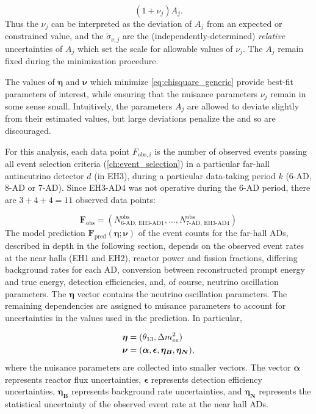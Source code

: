 \begin{equation}
    (1+\nu_j)A_j.
\end{equation}
Thus the $\nu_j$ can be interpreted as the deviation of $A_j$
from an expected or constrained value,
and the $\tilde{\sigma}_{\nu,j}$ are the (independently-determined)
\emph{relative} uncertainties of $A_j$
which set the scale for allowable values of $\nu_j$.
The $A_j$ remain fixed during the minimization procedure.

The values of $\boldsymbol{\eta}$ and $\boldsymbol{\nu}$
which minimize \cref{eq:chisquare_generic}
provide best-fit parameters of interest,
while ensuring that the nuisance parameters $\nu_j$
remain in some sense small.
Intuitively, the parameters $A_j$ are allowed to deviate slightly
from their estimated values,
but large deviations penalize the \chisquare{} and so are discouraged.

For this analysis, each data point $F_{\text{obs},i}$
is the number of observed events passing all event selection criteria
(\cref{ch:event_selection})
in a particular far-hall antineutrino detector $d$ (in EH3),
during a particular data-taking period $k$ (6-AD, 8-AD or 7-AD).
Since EH3-AD4 was not operative during the 6-AD period,
there are $3 + 4 + 4 = 11$ observed data points:

\begin{equation}
    \mathbf{F}_{\text{obs}} =
    (N^{\text{obs}}_{\text{6-AD, EH3-AD1}}, \ldots, N^{\text{obs}}_{\text{7-AD, EH3-AD4}})
\end{equation}
The model prediction
$\mathbf{F}_{\text{pred}}(\boldsymbol{\eta};\boldsymbol{\nu})$
of the event counts for the far-hall ADs,
described in depth in the following section,
depends on the observed event rates at the near halls (EH1 and EH2),
reactor power and fission fractions,
differing background rates for each AD,
conversion between reconstructed prompt energy and true \nuebar{} energy,
detection efficiencies,
and, of course, neutrino oscillation parameters.
The $\boldsymbol{\eta}$ vector contains the neutrino oscillation parameters.
The remaining dependencies are assigned to nuisance parameters
to account for uncertainties in the values used in the prediction.
In particular,

\begin{align}
    \begin{split}
        \boldsymbol{\eta} &= (\theta_{13}, \Delta m^2_{ee}) \\
        \boldsymbol{\nu} &= (
            \boldsymbol{\alpha},
            \boldsymbol{\epsilon},
            \boldsymbol{\eta_B},
            \boldsymbol{\eta_N}),
    \end{split}
\end{align}
where the nuisance parameters are collected into smaller vectors.
The vector $\boldsymbol{\alpha}$ represents reactor flux uncertainties,
$\boldsymbol{\epsilon}$ represents detection efficiency uncertainties,
$\boldsymbol{\eta_B}$ represents background rate uncertainties,
and $\boldsymbol{\eta_N}$ represents the statistical uncertainty
of the observed event rate at the near hall ADs.

